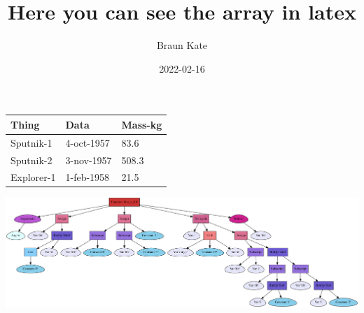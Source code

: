 \documentclass{article}
\title{Here you can see the array in latex}
\author{Braun Kate}
\date{2022-02-16}
\begin{document}
\maketitle

\begin{tabular}{| l | l | l |}\hline
Thing & Data & Mass-kg \\ \hline
Sputnik-1 & 4-oct-1957 & 83.6 \\ \hline
Sputnik-2 & 3-nov-1957 & 508.3 \\ \hline
Explorer-1 & 1-feb-1958 & 21.5 \\
\hline
\end{tabular}
\includegraphics[scale=0.22]{artifacts/AstTree.png}
\end{document}
